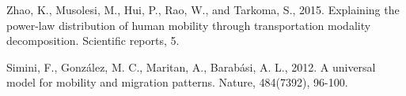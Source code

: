 \documentclass[10pt,letterpaper]{article}
\begin{document}
\begin{thebibliography}{10}
Zhao, K., Musolesi, M., Hui, P., Rao, W., and Tarkoma, S., 2015. Explaining the power-law distribution of human mobility through transportation modality decomposition. Scientific reports, 5.

Simini, F., González, M. C., Maritan, A., Barabási, A. L., 2012. A universal model for mobility and migration patterns. Nature, 484(7392), 96-100.

%

\end{thebibliography}
\end{document}

